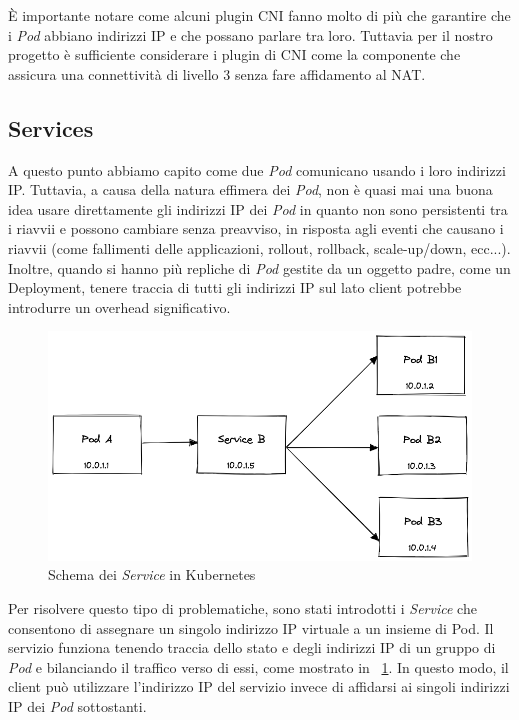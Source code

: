 \documentclass[12pt, hidelinks]{report}
\begin{document}
È importante notare come alcuni plugin CNI fanno molto di più che garantire che i \textit{Pod} abbiano indirizzi IP e che possano parlare tra loro. Tuttavia per il nostro progetto è sufficiente considerare i plugin di CNI come la componente che assicura una connettività di livello 3 senza fare affidamento al NAT.

\subsection{Services}
A questo punto abbiamo capito come due \textit{Pod} comunicano usando i loro indirizzi IP. Tuttavia, a causa della natura effimera dei \textit{Pod}, non è quasi mai una buona idea usare direttamente gli indirizzi IP dei \textit{Pod} in quanto non sono persistenti tra i riavvii e possono cambiare senza preavviso, in risposta agli eventi che causano i riavvii (come fallimenti delle applicazioni, rollout, rollback, scale-up/down, ecc...).
Inoltre, quando si hanno più repliche di \textit{Pod} gestite da un oggetto padre, come un Deployment, tenere traccia di tutti gli indirizzi IP sul lato client potrebbe introdurre un overhead significativo. 

\begin{figure}[H]
    \centering
    \includegraphics[width=\linewidth]{4-kubernetes-services.png}
    \caption{Schema dei \textit{Service}  in Kubernetes \cite{demystifying-kube-proxy}}
    \label{fig:kube_services}
\end{figure}

Per risolvere questo tipo di problematiche, sono stati introdotti i \textit{Service} che consentono di assegnare un singolo indirizzo IP virtuale a un insieme di Pod. Il servizio funziona tenendo traccia dello stato e degli indirizzi IP di un gruppo di \textit{Pod} e bilanciando il traffico verso di essi, come mostrato in \figurename~\ref{fig:kube_services}. In questo modo, il client può utilizzare l'indirizzo IP del servizio invece di affidarsi ai singoli indirizzi IP dei \textit{Pod} sottostanti.
\end{document}

